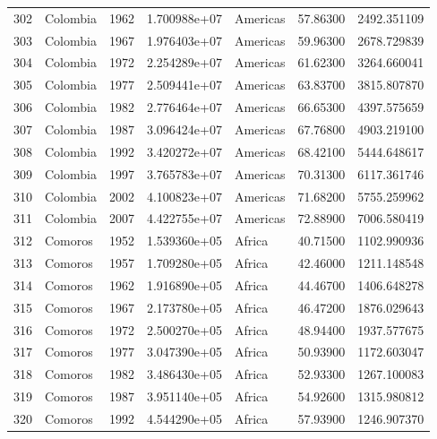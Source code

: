 \documentclass[
  letterpaper,
  DIV=11,
  numbers=noendperiod]{scrreprt}
\begin{document}
\begin{tabular}{llrrlrr}
302  &                  Colombia &  1962 &  1.700988e+07 &  Americas &  57.86300 &    2492.351109 \\
303  &                  Colombia &  1967 &  1.976403e+07 &  Americas &  59.96300 &    2678.729839 \\
304  &                  Colombia &  1972 &  2.254289e+07 &  Americas &  61.62300 &    3264.660041 \\
305  &                  Colombia &  1977 &  2.509441e+07 &  Americas &  63.83700 &    3815.807870 \\
306  &                  Colombia &  1982 &  2.776464e+07 &  Americas &  66.65300 &    4397.575659 \\
307  &                  Colombia &  1987 &  3.096424e+07 &  Americas &  67.76800 &    4903.219100 \\
308  &                  Colombia &  1992 &  3.420272e+07 &  Americas &  68.42100 &    5444.648617 \\
309  &                  Colombia &  1997 &  3.765783e+07 &  Americas &  70.31300 &    6117.361746 \\
310  &                  Colombia &  2002 &  4.100823e+07 &  Americas &  71.68200 &    5755.259962 \\
311  &                  Colombia &  2007 &  4.422755e+07 &  Americas &  72.88900 &    7006.580419 \\
312  &                   Comoros &  1952 &  1.539360e+05 &    Africa &  40.71500 &    1102.990936 \\
313  &                   Comoros &  1957 &  1.709280e+05 &    Africa &  42.46000 &    1211.148548 \\
314  &                   Comoros &  1962 &  1.916890e+05 &    Africa &  44.46700 &    1406.648278 \\
315  &                   Comoros &  1967 &  2.173780e+05 &    Africa &  46.47200 &    1876.029643 \\
316  &                   Comoros &  1972 &  2.500270e+05 &    Africa &  48.94400 &    1937.577675 \\
317  &                   Comoros &  1977 &  3.047390e+05 &    Africa &  50.93900 &    1172.603047 \\
318  &                   Comoros &  1982 &  3.486430e+05 &    Africa &  52.93300 &    1267.100083 \\
319  &                   Comoros &  1987 &  3.951140e+05 &    Africa &  54.92600 &    1315.980812 \\
320  &                   Comoros &  1992 &  4.544290e+05 &    Africa &  57.93900 &    1246.907370 \\

\end{tabular}
\end{document}
